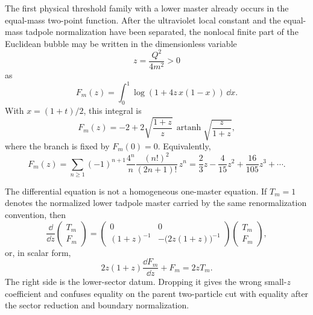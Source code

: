 \begin{controlledapproximation}
\label{ca:equal-mass-bubble-threshold-family}
The first physical threshold family with a lower master already occurs in the
equal-mass two-point function.  After the ultraviolet local constant and the
equal-mass tadpole normalization have been separated, the nonlocal finite
part of the Euclidean bubble may be written in the dimensionless variable
\[
  z=\frac{Q^2}{4m^2}>0
\]
as
\begin{equation}
  F_m(z)
  =
  \int_0^1
  \log\!\left(1+4z\,x(1-x)\right)\,\dd x .
  \label{eq:equal-mass-bubble-finite-part}
\end{equation}
With \(x=(1+t)/2\), this integral is
\begin{equation}
  F_m(z)
  =
  -2
  +2\sqrt{\frac{1+z}{z}}\,
    \operatorname{artanh}\sqrt{\frac{z}{1+z}},
  \label{eq:equal-mass-bubble-euclidean-solution}
\end{equation}
where the branch is fixed by \(F_m(0)=0\).  Equivalently,
\begin{equation}
  F_m(z)
  =
  \sum_{n\ge1}
  (-1)^{n+1}
  \frac{4^n}{n}
  \frac{(n!)^2}{(2n+1)!}\,z^n
  =
  \frac23z-\frac4{15}z^2+\frac{16}{105}z^3+\cdots .
  \label{eq:equal-mass-bubble-small-z-series}
\end{equation}

The differential equation is not a homogeneous one-master equation.  If
\(T_m=1\) denotes the normalized lower tadpole master carried by the same
renormalization convention, then
\begin{equation}
  \frac{\dd}{\dd z}
  \begin{pmatrix}T_m\\ F_m\end{pmatrix}
  =
  \begin{pmatrix}
    0&0\\[2pt]
    (1+z)^{-1}&-\bigl(2z(1+z)\bigr)^{-1}
  \end{pmatrix}
  \begin{pmatrix}T_m\\ F_m\end{pmatrix},
  \label{eq:equal-mass-bubble-master-system}
\end{equation}
or, in scalar form,
\begin{equation}
  2z(1+z)\frac{\dd F_m}{\dd z}+F_m=2zT_m .
  \label{eq:equal-mass-bubble-inhomogeneous-equation}
\end{equation}
The right side is the lower-sector datum.  Dropping it gives the wrong
small-\(z\) coefficient and confuses equality on the parent two-particle cut
with equality after the sector reduction and boundary normalization.


\end{controlledapproximation}
